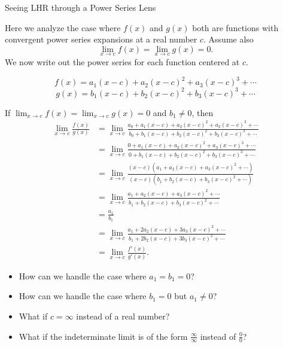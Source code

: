 \begin{exercise}{Seeing LHR through a Power Series Lens \Coffeecup \Coffeecup \Coffeecup \Coffeecup}

Here we analyze the case where $f(x)$ and $g(x)$ both are functions with convergent power series expansions at a real number $c$.  Assume also $$\lim_{x \rightarrow c}f(x)=\lim_{x \rightarrow c}g(x)=0.$$  We now write out the power series for each function centered at $c$.

$$ f(x)=a_1(x-c)+a_2(x-c)^2+a_3(x-c)^3+\cdots$$
$$ g(x)=b_1(x-c)+b_2(x-c)^2+b_3(x-c)^3+\cdots$$

If $\lim_{x \rightarrow c}f(x)=\lim_{x \rightarrow c}g(x)=0$ and $b_1\not =0$, then 
 \begin{align*}
  \lim_{x \rightarrow c}\frac{f(x)}{g(x)}&=\lim_{x \rightarrow c}\frac{a_0+a_1(x-c)+a_2(x-c)^2+a_3(x-c)^3+\cdots}{b_0+b_1(x-c)+b_2(x-c)^2+b_3(x-c)^3+\cdots} \\ 
  &=\lim_{x \rightarrow c}\frac{0+a_1(x-c)+a_2(x-c)^2+a_3(x-c)^3+\cdots}{0+b_1(x-c)+b_2(x-c)^2+b_3(x-c)^3+\cdots} \\
  &=\lim_{x \rightarrow c}\frac{(x-c)\left(a_1+a_2(x-c)+a_3(x-c)^2+\cdots\right)}{(x-c)\left(b_1+b_2(x-c)+b_3(x-c)^2+\cdots\right)} \\
  &=\lim_{x \rightarrow c}\frac{a_1+a_2(x-c)+a_3(x-c)^2+\cdots}{b_1+b_2(x-c)+b_3(x-c)^2+\cdots} \\
  &=\frac{a_1}{b_1} \\
  &=\lim_{x \rightarrow c}\frac{a_1+2a_2(x-c)+3a_3(x-c)^2+\cdots}{b_1+2b_2(x-c)+3b_3(x-c)^2+\cdots} \\
  &=\lim_{x \rightarrow c}\frac{f'(x)}{g'(x)}.
  \end{align*} 
\begin{itemize}
\item How can we handle the case where $a_1=b_1=0$?  \vspace*{1in}
\item How can we handle the case where $b_1=0$ but $a_1\not = 0$?  \vspace*{1in}
\item What if $c=\infty$ instead of a real number? \vspace*{1in}
\item What if the indeterminate limit is of the form $\frac{\infty}{\infty}$ instead of $\frac{0}{0}$? \vspace*{1in}
\end{itemize}
\end{exercise}
